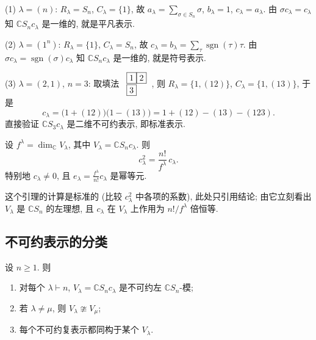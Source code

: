 \begin{example}\label{eg:app-symmetrizer-small}
\mbox{}\par\vspace{-0.2em}
(1) $\lambda=(n)$: $R_\lambda=S_n$, $C_\lambda=\{1\}$, 故 $a_\lambda=\sum_{\sigma\in S_n}\sigma$,
$b_\lambda=1$, $c_\lambda=a_\lambda$. 由 $\sigma c_\lambda=c_\lambda$ 知 $\mathbb{C}S_n c_\lambda$
是一维的, 就是平凡表示.

(2) $\lambda=(1^n)$: $R_\lambda=\{1\}$, $C_\lambda=S_n$, 故 $c_\lambda=b_\lambda
=\sum_\tau\operatorname{sgn}(\tau)\tau$. 由 $\sigma c_\lambda=\operatorname{sgn}(\sigma)c_\lambda$
知 $\mathbb{C}S_n c_\lambda$ 是一维的, 就是符号表示.

(3) $\lambda=(2,1)$, $n=3$: 取填法 $\begin{array}{l}\fbox{1}\fbox{2}\\[1pt]\fbox{3}\end{array}$, 则
$R_\lambda=\{1,(12)\}$, $C_\lambda=\{1,(13)\}$, 于是
\[
  c_\lambda=\bigl(1+(12)\bigr)\bigl(1-(13)\bigr)=1+(12)-(13)-(123).
\]
直接验证 $\mathbb{C}S_3c_\lambda$ 是二维不可约表示, 即标准表示.
\end{example}

\begin{lemma}\label{lem:app-c-square}
设 $f^\lambda=\dim_{\mathbb{C}}V_\lambda$, 其中 $V_\lambda=\mathbb{C}S_nc_\lambda$. 则
\[
  c_\lambda^2=\frac{n!}{f^\lambda}\,c_\lambda .
\]
特别地 $c_\lambda\ne0$, 且 $e_\lambda=\frac{f^\lambda}{n!}c_\lambda$ 是幂等元.
\end{lemma}

这个引理的计算是标准的 (比较 $c_\lambda^2$ 中各项的系数), 此处只引用结论; 由它立刻看出
$V_\lambda$ 是 $\mathbb{C}S_n$ 的左理想, 且 $c_\lambda$ 在 $V_\lambda$ 上作用为 $n!/f^\lambda$ 倍恒等.

\subsection{不可约表示的分类}

\begin{theorem}[Young]\label{thm:app-young}
设 $n\ge1$. 则
\begin{enumerate}
  \item 对每个 $\lambda\vdash n$, $V_\lambda=\mathbb{C}S_nc_\lambda$ 是不可约左 $\mathbb{C}S_n$-模;
  \item 若 $\lambda\ne\mu$, 则 $V_\lambda\ncong V_\mu$;
  \item 每个不可约复表示都同构于某个 $V_\lambda$.
\end{enumerate}
\end{theorem}

